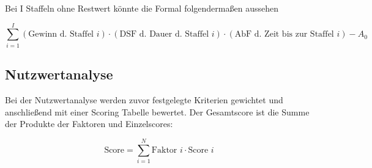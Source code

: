 \documentclass[../main.tex]{subfiles}
\begin{document}
                    Bei I Staffeln ohne Restwert könnte die Formal folgendermaßen aussehen
                    
                    \begin{equation}
                        \sum_{i=1}^I \left(\text{Gewinn d. Staffel $i$}\right) \cdot \left(\text{DSF d. Dauer d. Staffel $i$}\right) \cdot \left(\text{AbF d. Zeit bis zur Staffel $i$}\right) - A_0
                    \end{equation}
                    
            \subsection{Nutzwertanalyse}
                Bei der Nutzwertanalyse werden zuvor festgelegte Kriterien gewichtet und anschließend mit einer Scoring Tabelle bewertet. Der Gesamtscore ist die Summe der Produkte der Faktoren und Einzelscores:
                
                \begin{equation}
                    \text{Score} = \sum_{i=1}^N \text{Faktor $i$} \cdot \text{Score $i$}
                \end{equation}
                        
        
\end{document}
